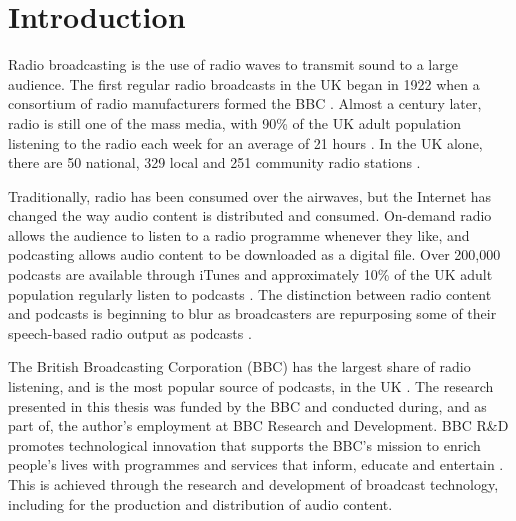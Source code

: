 \chapter{Introduction}\label{chp:intro}

Radio broadcasting is the use of radio waves to transmit sound to a large audience.  The first regular radio broadcasts
in the UK began in 1922 when a consortium of radio manufacturers formed the BBC \citep{BBC2015}.
Almost a century later, radio is still one of the mass media, with 90\% of the UK adult population listening to the
radio each week for an average of 21 hours \citep{RAJAR2017a}.  In the UK alone, there are 50 national, 329 local and
251 community radio stations \citep[pp. 6, 127]{Ofcom2017}.

Traditionally, radio has been consumed over the airwaves, but the Internet has changed the way audio content is
distributed and consumed.  On-demand radio allows the audience to listen to a radio programme whenever they like, and
podcasting allows audio content to be downloaded as a digital file. Over 200,000 podcasts are available through iTunes
\citep{Morgan2015} and approximately 10\% of the UK adult population regularly listen to podcasts \citep{RAJAR2017}.
The distinction between radio content and podcasts is beginning to blur as broadcasters are repurposing some of their
speech-based radio output as podcasts \citep[p.~98]{Ofcom2017}.

The British Broadcasting Corporation (BBC) has the largest share of radio listening, and is the most popular source of
podcasts, in the UK \citep[p. 107]{Ofcom2017}.
The research presented in this thesis was funded by the BBC and conducted during, and as part of, the author's
employment at BBC Research and Development.  BBC R\&D promotes technological innovation that supports the
BBC's mission to enrich people's lives with programmes and services that inform, educate and entertain \citep[art.
15]{BBCCharter2016}.  This is achieved through the research and development of broadcast technology, including for the
production and distribution of audio content.

